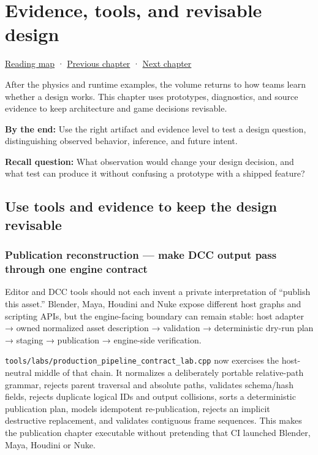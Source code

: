 \hypertarget{06-engine-ii-ch041}{}
\chapter{Evidence, tools, and revisable design}\label{06-engine-ii-ch041-evidence-tools-and-revisable-design}

\hyperref[volume-reading-map]{Reading map} · \hyperref[06-engine-ii-ch040-coupled-contacts-and-iterative-response]{Previous chapter} · \hyperref[06-engine-ii-ch042-from-cartridge-bytes-to-a-reproducible-machine]{Next chapter}

After the physics and runtime examples, the volume returns to how teams learn whether a design works. This chapter uses prototypes, diagnostics, and source evidence to keep architecture and game decisions revisable.

\textbf{By the end:} Use the right artifact and evidence level to test a design question, distinguishing observed behavior, inference, and future intent.

\textbf{Recall question:} What observation would change your design decision, and what test can produce it without confusing a prototype with a shipped feature?

\section{Use tools and evidence to keep the design revisable}\label{06-engine-ii-ch041-use-tools-and-evidence-to-keep-the-design-revisable}

\subsection{Publication reconstruction --- make DCC output pass through one engine contract}\label{06-engine-ii-ch041-publication-reconstruction-make-dcc-output-pass-through-one-engine-contract}

Editor and DCC tools should not each invent a private interpretation of ``publish this asset.'' Blender, Maya, Houdini and Nuke expose different host graphs and scripting APIs, but the engine-facing boundary can remain stable: host adapter → owned normalized asset description → validation → deterministic dry-run plan → staging → publication → engine-side verification.

\texttt{tools/labs/production\_pipeline\_contract\_lab.cpp} now exercises the host-neutral middle of that chain. It normalizes a deliberately portable relative-path grammar, rejects parent traversal and absolute paths, validates schema/hash fields, rejects duplicate logical IDs and output collisions, sorts a deterministic publication plan, models idempotent re-publication, rejects an implicit destructive replacement, and validates contiguous frame sequences. This makes the publication chapter executable without pretending that CI launched Blender, Maya, Houdini or Nuke.

